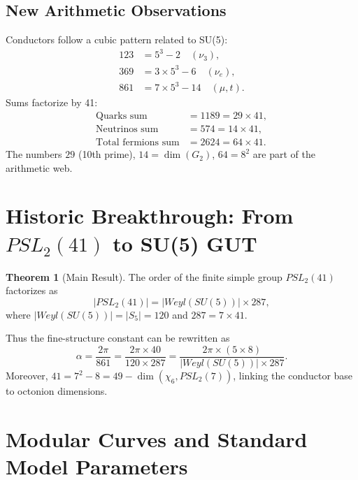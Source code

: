﻿\documentclass[11pt,a4paper]{article}
\theoremstyle{definition}
\newtheorem{theorem}{Theorem}
\begin{document}
\subsection{New Arithmetic Observations}
Conductors follow a cubic pattern related to SU(5):
\begin{align}
123 &= 5^3 - 2 \quad (\nu_3),\\
369 &= 3 \times 5^3 - 6 \quad (\nu_e),\\
861 &= 7 \times 5^3 - 14 \quad (\mu, t).
\end{align}
Sums factorize by 41:
\begin{align}
\text{Quarks sum} &= 1189 = 29 \times 41,\\
\text{Neutrinos sum} &= 574 = 14 \times 41,\\
\text{Total fermions sum} &= 2624 = 64 \times 41.
\end{align}
The numbers $29$ (10th prime), $14 = \dim(G_2)$, $64 = 8^2$ are part of the arithmetic web.

\section{Historic Breakthrough: From $PSL_2(41)$ to SU(5) GUT}

\begin{theorem}[Main Result]
The order of the finite simple group $PSL_2(41)$ factorizes as
\begin{equation}
|PSL_2(41)| = |Weyl(SU(5))| \times 287,
\end{equation}
where $|Weyl(SU(5))| = |S_5| = 120$ and $287 = 7 \times 41$.
\end{theorem}
Thus the fine-structure constant can be rewritten as
\begin{equation}
\alpha = \frac{2\pi}{861} = \frac{2\pi \times 40}{120 \times 287} = \frac{2\pi \times (5 \times 8)}{|Weyl(SU(5))| \times 287}.
\end{equation}
Moreover, $41 = 7^2 - 8 = 49 - \dim(\chi_6, PSL_2(7))$, linking the conductor base to octonion dimensions.

\section{Modular Curves and Standard Model Parameters}
\label{sec:modular}
\end{document}
